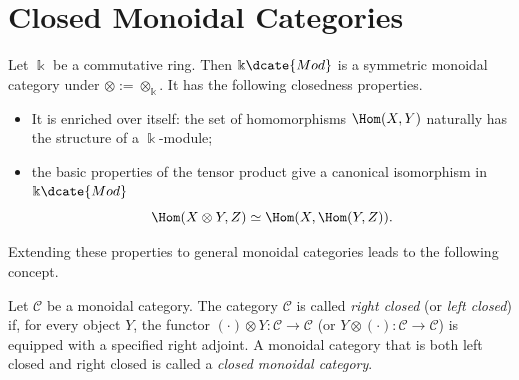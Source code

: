 
\section{Closed Monoidal Categories}\label{sec:closed-monoidal}
\hypertarget{o014.aljabr2.chapter7.closed-monoidal-categories}{ }

Let $\Bbbk$ be a commutative ring. Then $\Bbbk\dcate{Mod}$ is a symmetric
monoidal category under $\otimes:=\otimes_{\Bbbk}$. It has the following
closedness properties.
\begin{itemize}
	\item It is enriched over itself: the set of homomorphisms $\Hom(X,Y)$
	naturally has the structure of a $\Bbbk$-module;
	\item the basic properties of the tensor product give a canonical
	isomorphism in $\Bbbk\dcate{Mod}$
	\[ \Hom(X \otimes Y, Z) \simeq \Hom(X, \Hom(Y, Z)). \]
\end{itemize}

Extending these properties to general monoidal categories leads to the
following concept.

\begin{definition}\label{def:closed-monoidal-cat}
	Let $\mathcal{C}$ be a monoidal category. The category $\mathcal{C}$ is
	called \emph{right closed} (or \emph{left closed}) if, for every object
	$Y$, the functor $(\cdot)\otimes Y:\mathcal{C}\to\mathcal{C}$ (or
	$Y\otimes(\cdot):\mathcal{C}\to\mathcal{C}$) is equipped with a specified
	right adjoint. A monoidal category that is both left closed and right
	closed is called a \emph{closed monoidal category}.
\end{definition}

